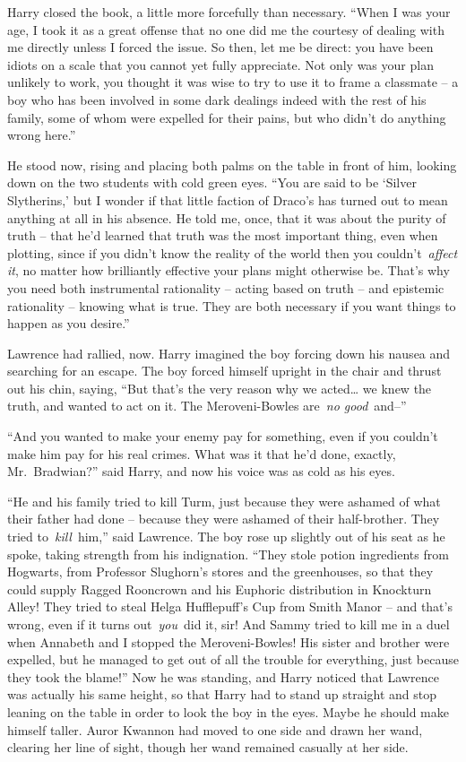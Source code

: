 Harry closed the book, a little more forcefully than necessary. ``When I
was your age, I took it as a great offense that no one did me the
courtesy of dealing with me directly unless I forced the issue. So then,
let me be direct: you have been idiots on a scale that you cannot yet
fully appreciate. Not only was your plan unlikely to work, you thought
it was wise to try to use it to frame a classmate -- a boy who has been
involved in some dark dealings indeed with the rest of his family, some
of whom were expelled for their pains, but who didn't do anything wrong
here.''

He stood now, rising and placing both palms on the table in front of
him, looking down on the two students with cold green eyes. ``You are
said to be `Silver Slytherins,' but I wonder if that little faction of
Draco's has turned out to mean anything at all in his absence. He told
me, once, that it was about the purity of truth -- that he'd learned
that truth was the most important thing, even when plotting, since if
you didn't know the reality of the world then you couldn't~\emph{affect
it}, no matter how brilliantly effective your plans might otherwise be.
That's why you need both instrumental rationality -- acting based on
truth -- and epistemic rationality -- knowing what is true. They are
both necessary if you want things to happen as you desire.''

Lawrence had rallied, now. Harry imagined the boy forcing down his
nausea and searching for an escape. The boy forced himself upright in
the chair and thrust out his chin, saying, ``But that's the very reason
why we acted\ldots{} we knew the truth, and wanted to act on it. The
Meroveni-Bowles are~\emph{no good}~and--''

``And you wanted to make your enemy pay for something, even if you
couldn't make him pay for his real crimes. What was it that he'd done,
exactly, Mr.~Bradwian?'' said Harry, and now his voice was as cold as
his eyes.

``He and his family tried to kill Turm, just because they were ashamed
of what their father had done -- because they were ashamed of their
half-brother. They tried to~\emph{kill}~him,'' said Lawrence. The boy
rose up slightly out of his seat as he spoke, taking strength from his
indignation. ``They stole potion ingredients from Hogwarts, from
Professor Slughorn's stores and the greenhouses, so that they could
supply Ragged Rooncrown and his Euphoric distribution in Knockturn
Alley! They tried to steal Helga Hufflepuff's Cup from Smith Manor --
and that's wrong, even if it turns out~\emph{you}~did it, sir! And Sammy
tried to kill me in a duel when Annabeth and I stopped the
Meroveni-Bowles! His sister and brother were expelled, but he managed to
get out of all the trouble for everything, just because they took the
blame!'' Now he was standing, and Harry noticed that Lawrence was
actually his same height, so that Harry had to stand up straight and
stop leaning on the table in order to look the boy in the eyes. Maybe he
should make himself taller. Auror Kwannon had moved to one side and
drawn her wand, clearing her line of sight, though her wand remained
casually at her side.

